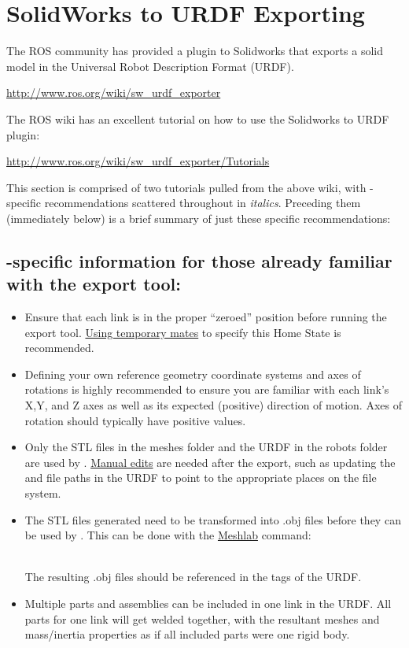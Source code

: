 \chapter{SolidWorks to URDF Exporting}\label{sw2urdf}

The ROS community has provided a plugin  to Solidworks that exports a solid model in the Universal Robot Description Format (URDF).
\\ \centerline{\url{http://www.ros.org/wiki/sw\_urdf\_exporter}}
The ROS wiki has an excellent tutorial on how to use the Solidworks to URDF plugin: 
\\ \centerline{\url{http://www.ros.org/wiki/sw\_urdf\_exporter/Tutorials}}
This section is comprised of two tutorials pulled from the above wiki, with \drake-specific recommendations scattered throughout in \emph{italics}.  Preceding them (immediately below) is a brief summary of just these specific recommendations:

\section{\drake-specific information for those already familiar with the export tool:}\label{sec:ExportSummary}
\begin{itemize}
\item Ensure that each link is in the proper ``zeroed'' position before running the export tool.  \hyperref[sec:ExportHomeState]{Using temporary mates} to specify this Home State is recommended.
\item Defining your own reference geometry coordinate systems and axes of rotations is highly recommended to ensure you are familiar with each link's X,Y, and Z axes as well as its expected (positive) direction of motion.  Axes of rotation should typically have positive values.
\item Only the STL files in the meshes folder and the URDF in the robots folder are used by \drake.  \hyperref[sec:ExportBuiltPackage]{Manual edits} are needed after the export, such as updating the and  file paths in the URDF to point to the appropriate places on the file system.
\item The STL files generated need to be transformed into .obj files before they can be used by \drake. This can be done with the \href{http://meshlab.sourceforge.net/}{Meshlab} command:
\\ \centerline{}
\\ The resulting .obj files should be referenced in the  tags of the URDF.
\item Multiple parts and assemblies can be included in one link in the URDF.  All parts for one link will get welded together, with the resultant meshes and mass/inertia properties as if all included parts were one rigid body.

\end{itemize}

